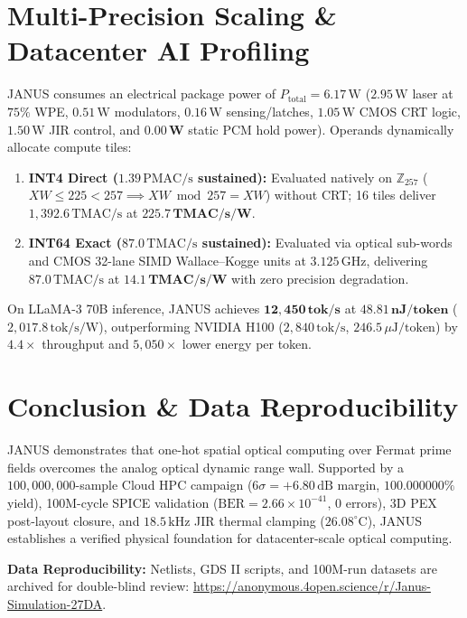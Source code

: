 \documentclass[letterpaper,twocolumn,10pt]{article}
\begin{document}
\section{Multi-Precision Scaling \& Datacenter AI Profiling}
JANUS consumes an electrical package power of $P_{\text{total}} = 6.17\,\text{W}$ ($2.95\,\text{W}$ laser at $75\%$ WPE, $0.51\,\text{W}$ modulators, $0.16\,\text{W}$ sensing/latches, $1.05\,\text{W}$ CMOS CRT logic, $1.50\,\text{W}$ JIR control, and $\mathbf{0.00\,\text{W}}$ static PCM hold power). Operands dynamically allocate compute tiles:
\begin{enumerate}
\item \textbf{INT4 Direct ($1.39\,\text{PMAC/s}$ sustained):} Evaluated natively on $\mathbb{Z}_{257}$ ($XW \le 225 < 257 \implies XW \bmod 257 = XW$) without CRT; 16 tiles deliver $1,392.6\,\text{TMAC/s}$ at $\mathbf{225.7\,\text{TMAC/s/W}}$.
\item \textbf{INT64 Exact ($87.0\,\text{TMAC/s}$ sustained):} Evaluated via optical sub-words and CMOS 32-lane SIMD Wallace--Kogge units at $3.125\,\text{GHz}$, delivering $87.0\,\text{TMAC/s}$ at $\mathbf{14.1\,\text{TMAC/s/W}}$ with zero precision degradation.
\end{enumerate}

On LLaMA-3 70B inference, JANUS achieves $\mathbf{12,450\,\text{tok/s}}$ at $\mathbf{48.81\,\text{nJ/token}}$ ($2,017.8\,\text{tok/s/W}$), outperforming NVIDIA H100 ($2,840\,\text{tok/s}$, $246.5\,\mu\text{J/token}$) by $4.4\times$ throughput and $5,050\times$ lower energy per token.

\section{Conclusion \& Data Reproducibility}
JANUS demonstrates that one-hot spatial optical computing over Fermat prime fields overcomes the analog optical dynamic range wall. Supported by a $100,000,000$-sample Cloud HPC campaign ($6\sigma = +6.80\,\text{dB}$ margin, $100.000000\%$ yield), 100M-cycle SPICE validation ($\text{BER} = 2.66 \times 10^{-41}$, $0$ errors), 3D PEX post-layout closure, and $18.5\,\text{kHz}$ JIR thermal clamping ($26.08^\circ\text{C}$), JANUS establishes a verified physical foundation for datacenter-scale optical computing.

\noindent\textbf{Data Reproducibility:} Netlists, GDS II scripts, and 100M-run datasets are archived for double-blind review: \url{https://anonymous.4open.science/r/Janus-Simulation-27DA}.



\end{document}
